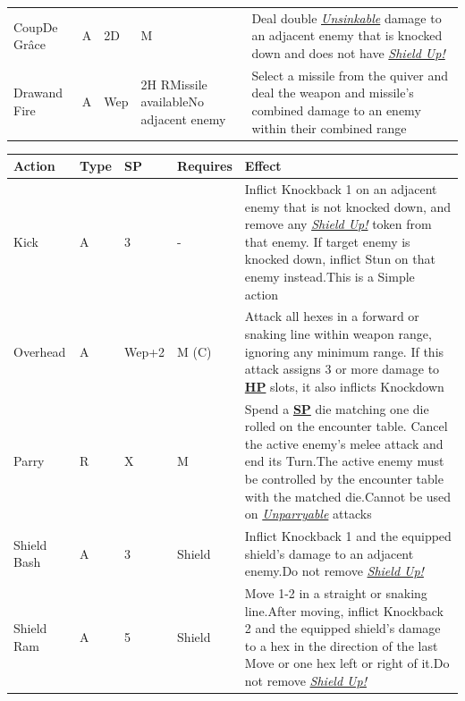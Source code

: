 \documentclass[12pt]{article}
\newcommand{\refto}[1]{\hyperlink{#1}{\textbf{#1}}}
\newcommand{\reftoit}[1]{\hyperlink{#1}{\emph{#1}}}
\begin{document}
\begin{center}
\begin{tabularx}{\textwidth}{p{}p{}p{}p{}p{}}
Coup\newline De Grâce & A & 2D & M & Deal double \reftoit{Unsinkable} damage to an adjacent enemy that is knocked down and does not have \reftoit{Shield Up!}\\
Draw\newline and Fire & A & Wep & 2H R\newline Missile available\newline No adjacent enemy & Select a missile from the quiver and deal the weapon and missile’s combined damage to an enemy within their combined range\\
\hline
\end{tabularx}
\end{center}

\pagebreak

\begin{center}
\begin{tabularx}{\textwidth}{p{}p{}p{}p{}p{}}
\hline
\rowcolor{white} \textbf{Action} & \textbf{Type} & \textbf{SP} & \textbf{Requires} & \textbf{Effect}\setcounter{rownum}{0}\\
\hline
Kick & A & 3 & - & Inflict Knockback 1 on an adjacent enemy that is not knocked down, and remove any \reftoit{Shield Up!} token from that enemy.\newline
If target enemy is knocked down, inflict Stun on that enemy instead.\newline This is a Simple action\\
Overhead & A & Wep+2 & M (C) & Attack all hexes in a forward or snaking line within weapon range, ignoring any minimum range.\newline
If this attack assigns 3 or more damage to \refto{HP} slots, it also inflicts Knockdown\\
Parry & R & X & M & Spend a \refto{SP} die matching one die rolled on the encounter table. Cancel the active enemy’s melee attack and end its Turn.\newline The active enemy must be controlled by the encounter table with the matched die.\newline Cannot be used on \reftoit{Unparryable} attacks\\
Shield Bash & A & 3 & Shield & Inflict Knockback 1 and the equipped shield’s damage to an adjacent enemy.\newline Do not remove \reftoit{Shield Up!}\\
Shield Ram & A & 5 & Shield & Move 1-2 in a straight or snaking line.\newline After moving, inflict Knockback 2 and the equipped shield’s damage to a hex in the direction of the last Move or one hex left or right of it.\newline Do not remove \reftoit{Shield Up!}\\

\end{tabularx}
\end{center}
\end{document}

